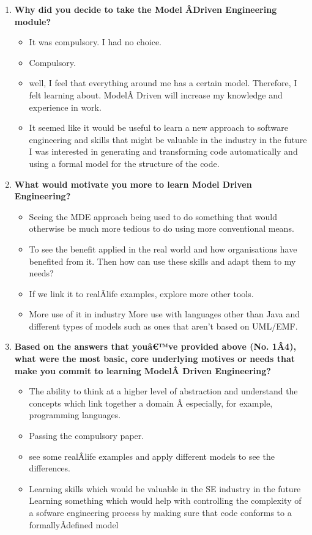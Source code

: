 \documentclass[12pt, a4paper]{report}
\begin{document}
\begin{appendices}
\begin{enumerate}
\item \textbf{ Why did you decide to take the Model Â­Driven Engineering module?}
\begin{itemize}
\item It was compulsory. I had no choice.
\item Compulsory.
\item well, I feel that everything around me has a certain model. Therefore, I felt learning about. ModelÂ­ Driven will increase my knowledge and experience in work. 
\item It seemed like it would be useful to learn a new approach to software engineering and skills that might be valuable in the industry in the future I was interested in generating and transforming code automatically and using a formal model for the structure of the code.
\end{itemize}


\item \textbf{ What would motivate you more to learn Model Driven Engineering?}
\begin{itemize}
\item Seeing the MDE approach being used to do something that would otherwise be much more tedious to do using more conventional means.
\item To see the benefit applied in the real world and how organisations have benefited from it. Then how can use these skills and adapt them to my needs?
\item If we link it to realÂ­life examples, explore more other tools.
\item More use of it in industry More use with languages other than Java and different types of models such as ones that aren't based on UML/EMF.
\end{itemize}

\item \textbf{ Based on the answers that youâ€™ve provided above (No. 1Â­4), what were the most basic, core underlying motives or needs that make you commit to learning ModelÂ­
Driven Engineering?}

\begin{itemize}
\item The ability to think at a higher level of abstraction and understand the concepts which link together a domain Â­ especially, for example, programming languages. 
\item Passing the compulsory paper.
\item see some realÂ­life examples and apply different models to see the differences. 
\item Learning skills which would be valuable in the SE industry in the future Learning something which would help with controlling the complexity of a sofware engineering process by making sure that code
conforms to a formallyÂ­defined model
\end{itemize}



\end{enumerate}
\end{appendices}
\end{document}
